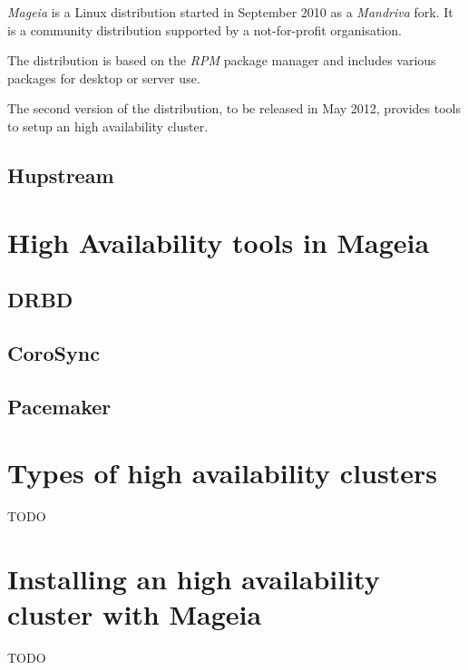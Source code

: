 \documentclass[a4paper,12pt]{article}
\begin{document}
\emph{Mageia} is a Linux distribution started in September 2010 as a
\emph{Mandriva} fork. It is a community distribution supported by a
not-for-profit organisation.

The distribution is based on the \emph{RPM} package manager and includes
various packages for desktop or server use.

The second version of the distribution, to be released in May 2012,
provides tools to setup an high availability cluster.


\cleardoublepage
\subsection{Hupstream}

\cleardoublepage
\section{High Availability tools in Mageia}
\subsection{DRBD}
\subsection{CoroSync}
\subsection{Pacemaker}

\cleardoublepage
\section{Types of high availability clusters}
TODO

\cleardoublepage
\section{Installing an high availability cluster with Mageia}
TODO

\cleardoublepage
\end{document}
